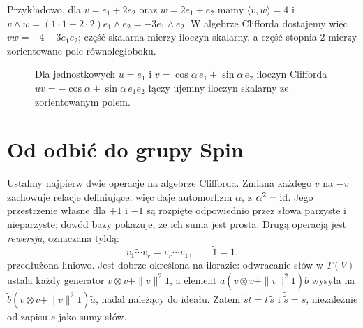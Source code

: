 Przykładowo, dla $v=e_1+2e_2$ oraz $w=2e_1+e_2$
mamy $\langle v,w\rangle=4$ i
$v\wedge w=(1\cdot1-2\cdot2)e_1\wedge e_2
=-3e_1\wedge e_2$. W algebrze Clifforda dostajemy
więc $vw=-4-3e_1e_2$; część skalarna mierzy
iloczyn skalarny, a część stopnia $2$ mierzy
zorientowane pole równoległoboku.

\begin{figure}[!htbp]
\centering
{}
\caption{Dla jednostkowych $u=e_1$ i
$v=\cos\alpha\,e_1+\sin\alpha\,e_2$ iloczyn Clifforda
$uv=-\cos\alpha+\sin\alpha\,e_1e_2$ łączy
ujemny iloczyn skalarny ze zorientowanym polem.}
\label{fig:cliff-iloczyn}
\end{figure}

\section{Od odbić do grupy Spin}
\label{sec:spin-grupa}

Ustalmy najpierw dwie operacje na algebrze Clifforda.
Zmiana każdego $v$ na $-v$ zachowuje relacje definiujące,
więc daje automorfizm $\alpha$, z $\alpha^2=\mathrm{id}$.
Jego przestrzenie własne dla $+1$ i $-1$ są rozpięte
odpowiednio przez słowa parzyste i nieparzyste; dowód bazy
pokazuje, że ich suma jest prosta.
Drugą operacją jest \emph{rewersja}, oznaczana tyldą:
\[
 \widetilde{v_1\cdots v_r}=v_r\cdots v_1,\qquad
 \widetilde 1=1,
\]
przedłużona liniowo. Jest dobrze określona na ilorazie:
odwracanie słów w $T(V)$ ustala każdy generator
$v\otimes v+\|v\|^2 1$, a element $a(v\otimes v+\|v\|^2 1)b$
wysyła na $\widetilde b(v\otimes v+\|v\|^2 1)\widetilde a$,
nadal należący do ideału. Zatem
$\widetilde{st}=\widetilde t\,\widetilde s$ i
$\widetilde{\widetilde s}=s$, niezależnie od zapisu $s$ jako sumy słów.

